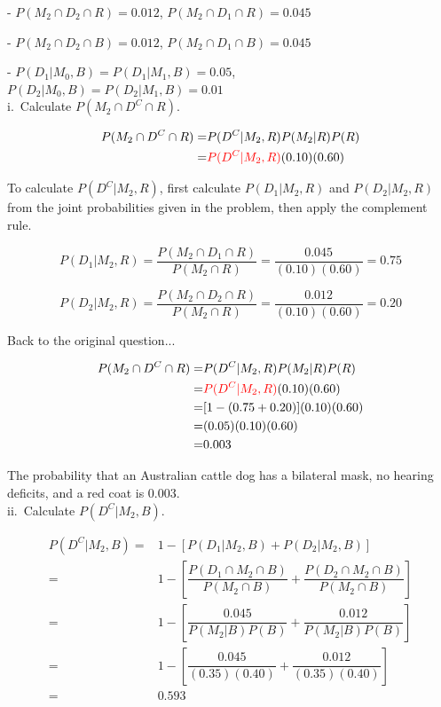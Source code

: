 {	- $P(M_2 \cap D_2 \cap R) = 0.012$, $P(M_2 \cap D_1 \cap R) = 0.045$

	- $P(M_2 \cap D_2 \cap B) = 0.012$, $P(M_2 \cap D_1 \cap B) = 0.045$

	- $P(D_1| M_0, B) = P(D_1| M_1, B) = 0.05$, $P(D_2 | M_0, B) = P(D_2 | M_1, B) = 0.01$ \\
	i.~Calculate $P(M_2 \cap D^C \cap R)$.

	\begin{align*}
	P(M_2 \cap D^C \cap R) =& P(D^C|M_2, R)P(M_2|R)P(R) \\
	=& \textcolor{red}{P(D^C|M_2, R)}(0.10)(0.60) \\
	\end{align*}

	To calculate $P(D^C|M_2, R)$, first calculate $P(D_1|M_2, R)$ and $P(D_2|M_2, R)$ from the joint probabilities given in the problem, then apply the complement rule.

	\[P(D_1|M_2, R) = \dfrac{P(M_2 \cap D_1 \cap R)}{P(M_2 \cap R)} = \dfrac{0.045}{(0.10)(0.60)} = 0.75\]

	\[P(D_2|M_2, R) = \dfrac{P(M_2 \cap D_2 \cap R)}{P(M_2 \cap R)} = \dfrac{0.012}{(0.10)(0.60)} = 0.20\]

	Back to the original question...

	\begin{align*}
	P(M_2 \cap D^C \cap R) =& P(D^C|M_2, R)P(M_2|R)P(R) \\
	=& \textcolor{red}{P(D^C|M_2, R)}(0.10)(0.60) \\
	=& [1 - (0.75 + 0.20)](0.10)(0.60) \\
	=& (0.05)(0.10)(0.60) \\
	=& 0.003
	\end{align*}

	The probability that an Australian cattle dog has a bilateral mask, no hearing deficits, and a red coat is 0.003. \\
	ii.~Calculate $P(D^C|M_2, B)$.

	\begin{align*}
	P(D^C|M_2, B) =& 1 - [P(D_1|M_2, B) + P(D_2|M_2, B)] \\
	=& 1 - \left[ \dfrac{P(D_1 \cap M_2 \cap B)}{P(M_2 \cap B)} + \dfrac{P(D_2 \cap M_2 \cap B)}{P(M_2 \cap B)} \right] \\
	=& 1 - \left[ \dfrac{0.045}{P(M_2|B)P(B)} + \dfrac{0.012}{P(M_2|B)P(B)} \right] \\
	=& 1 - \left[ \dfrac{0.045}{(0.35)(0.40)} + \dfrac{0.012}{(0.35)(0.40)} \right] \\
	=& 0.593
	\end{align*}

}
